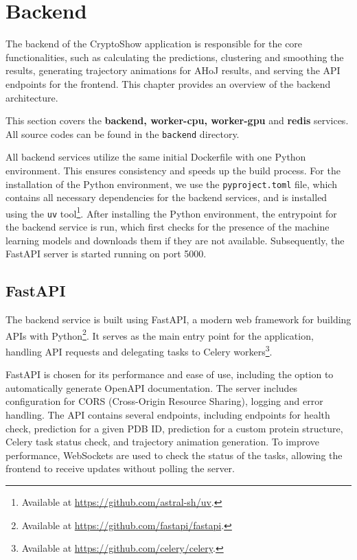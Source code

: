\section{Backend}
\label{sec:backend}

The backend of the CryptoShow application is responsible for the core functionalities, such as calculating the predictions, clustering and smoothing the results, generating trajectory animations for AHoJ results, and serving the API endpoints for the frontend. This chapter provides an overview of the backend architecture.

This section covers the \textbf{backend, worker-cpu, worker-gpu} and \textbf{redis} services. All source codes can be found in the \lstinline!backend! directory.

All backend services utilize the same initial Dockerfile with one Python environment. This ensures consistency and speeds up the build process. For the installation of the Python environment, we use the \lstinline!pyproject.toml! file, which contains all necessary dependencies for the backend services, and is installed using the \lstinline|uv| tool\footnote{Available at \url{https://github.com/astral-sh/uv}.}. After installing the Python environment, the entrypoint for the backend service is run, which first checks for the presence of the machine learning models and downloads them if they are not available. Subsequently, the FastAPI server is started running on port 5000.

\subsection{FastAPI}
\label{sec:fastapi}

The backend service is built using FastAPI, a modern web framework for building APIs with Python\footnote{Available at \url{https://github.com/fastapi/fastapi}.}. It serves as the main entry point for the application, handling API requests and delegating tasks to Celery workers\footnote{Available at \url{https://github.com/celery/celery}.}.

FastAPI is chosen for its performance and ease of use, including the option to automatically generate OpenAPI documentation. The server includes configuration for CORS (Cross-Origin Resource Sharing), logging and error handling. The API contains several endpoints, including endpoints for health check, prediction for a given PDB ID, prediction for a custom protein structure, Celery task status check, and trajectory animation generation. To improve performance, WebSockets are used to check the status of the tasks, allowing the frontend to receive updates without polling the server.

